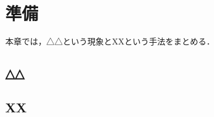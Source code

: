 \chapter{準備}\label{chap:2_preliminaries}
本章では，△△という現象とXXという手法をまとめる．

\section{△△}\label{sec:2_triangle}

\section{XX}\label{sec:2_xx}
